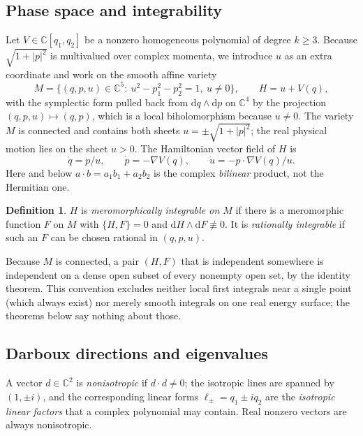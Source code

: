 \documentclass[11pt]{article}
\numberwithin{equation}{section}
\theoremstyle{definition}
\newtheorem{definition}[theorem]{Definition}
\theoremstyle{remark}
\newcommand{\C}{\mathbb C}
\newcommand{\dd}{\mathrm d}
\begin{document}
\subsection{Phase space and integrability}
Let $V\in\C[q_1,q_2]$ be a nonzero homogeneous polynomial of degree $k\ge3$. Because $\sqrt{1+|p|^2}$ is
multivalued over complex momenta, we introduce $u$ as an extra coordinate and work on the smooth affine variety
\begin{equation}\label{eq:M}
M=\{(q,p,u)\in\C^5:\ u^2-p_1^2-p_2^2=1,\ u\ne0\},\qquad H=u+V(q),
\end{equation}
with the symplectic form pulled back from $\dd q\wedge\dd p$ on $\C^4$ by the projection $(q,p,u)\mapsto(q,p)$,
which is a local biholomorphism because $u\ne0$. The variety $M$ is connected and contains both sheets
$u=\pm\sqrt{1+|p|^2}$; the real physical motion lies on the sheet $u>0$. The Hamiltonian vector field of $H$ is
\begin{equation}\label{eq:flow}
\dot q=p/u,\qquad \dot p=-\nabla V(q),\qquad \dot u=-p\cdot\nabla V(q)/u .
\end{equation}
Here and below $a\cdot b=a_1b_1+a_2b_2$ is the complex \emph{bilinear} product, not the Hermitian one.

\begin{definition}\label{def:integrable}
$H$ is \emph{meromorphically integrable on $M$} if there is a meromorphic function $F$ on $M$ with $\{H,F\}=0$ and
$\dd H\wedge \dd F\not\equiv0$. It is \emph{rationally integrable} if such an $F$ can be chosen rational in
$(q,p,u)$.
\end{definition}

Because $M$ is connected, a pair $(H,F)$ that is independent somewhere is independent on a dense open subset of every
nonempty open set, by the identity theorem. This convention excludes neither local first integrals near a single
point (which always exist) nor merely smooth integrals on one real energy surface; the theorems below say nothing
about those.

\subsection{Darboux directions and eigenvalues}
A vector $d\in\C^2$ is \emph{nonisotropic} if $d\cdot d\ne0$; the isotropic lines are spanned by $(1,\pm i)$, and
the corresponding linear forms $\ell_\pm=q_1\pm iq_2$ are the \emph{isotropic linear factors} that a complex
polynomial may contain. Real nonzero vectors are always nonisotropic.
\end{document}
